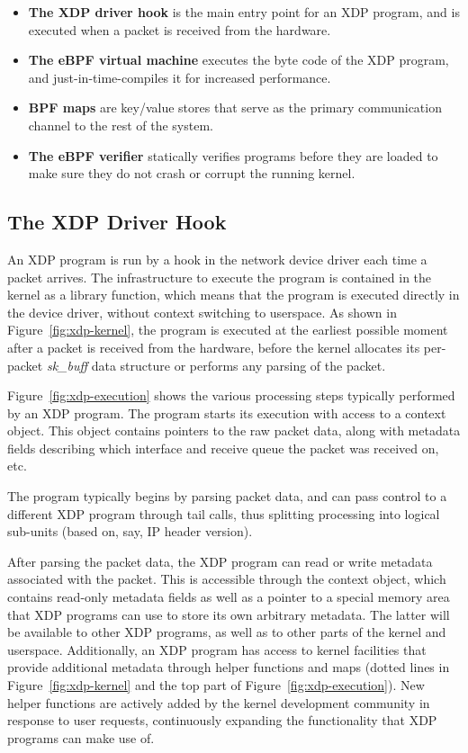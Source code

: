 \documentclass[sigconf]{acmart}
\begin{document}
\begin{itemize}
\item \textbf{The XDP driver hook} is the main entry point for an XDP program,
  and is executed when a packet is received from the hardware.

\item \textbf{The eBPF virtual machine} executes the byte code of the XDP
  program, and just-in-time-compiles it for increased performance.

\item \textbf{BPF maps} are key/value stores that serve as the primary
  communication channel to the rest of the system.

\item \textbf{The eBPF verifier} statically verifies programs before they are
  loaded to make sure they do not crash or corrupt the running kernel.
\end{itemize}


\subsection{The XDP Driver Hook}
\label{sec:prog-model}


An XDP program is run by a hook in the network device driver each time a packet
arrives. The infrastructure to execute the program is contained in the kernel as
a library function, which means that the program is executed directly in the
device driver, without context switching to userspace. As shown in
Figure~\ref{fig:xdp-kernel}, the program is executed at the earliest possible
moment after a packet is received from the hardware, before the kernel allocates
its per-packet \emph{sk\_buff} data structure or performs any parsing of the
packet.

Figure~\ref{fig:xdp-execution} shows the various processing steps typically
performed by an XDP program. The program starts its execution with access to a
context object. This object contains pointers to the raw packet data, along with
metadata fields describing which interface and receive queue the packet was
received on, etc.

The program typically begins by parsing packet data, and can pass control to a
different XDP program through tail calls, thus splitting processing into
logical sub-units (based on, say, IP header version).

After parsing the packet data, the XDP program can read or write metadata
associated with the packet. This is accessible through the context object, which
contains read-only metadata fields as well as a pointer to a special memory area
that XDP programs can use to store its own arbitrary metadata. The latter will
be available to other XDP programs, as well as to other parts of the kernel and
userspace.
%
Additionally, an XDP program has access to kernel facilities that
provide additional metadata through helper functions and maps (dotted lines in
Figure~\ref{fig:xdp-kernel} and the top part of Figure~\ref{fig:xdp-execution}).
New helper functions are actively added by the kernel development community in
response to user requests, continuously expanding the functionality that XDP
programs can make use of.
\end{document}

